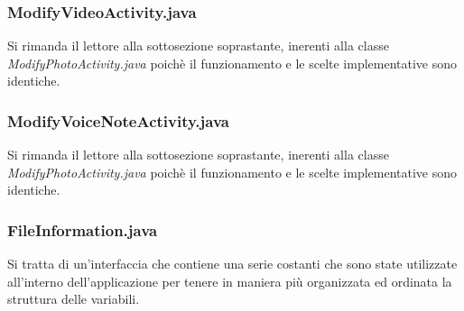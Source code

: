 \subsubsection{ModifyVideoActivity.java}
Si rimanda il lettore alla sottosezione soprastante, inerenti alla classe \textit{ModifyPhotoActivity.java} poichè il funzionamento e le scelte implementative sono identiche.

\subsubsection{ModifyVoiceNoteActivity.java}
Si rimanda il lettore alla sottosezione soprastante, inerenti alla classe \textit{ModifyPhotoActivity.java} poichè il funzionamento e le scelte implementative sono identiche.

\subsubsection{FileInformation.java}
Si tratta di un'interfaccia che contiene una serie costanti che sono state utilizzate all'interno dell'applicazione per tenere in maniera più organizzata ed ordinata la struttura delle variabili.

